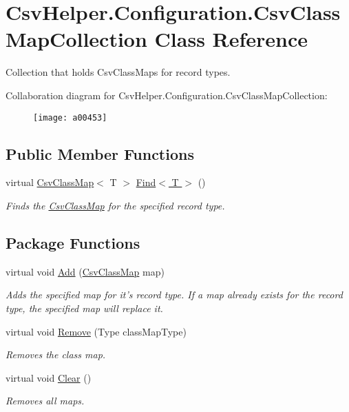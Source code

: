 \hypertarget{a00059}{\section{Csv\-Helper.\-Configuration.\-Csv\-Class\-Map\-Collection Class Reference}
\label{a00059}
}


Collection that holds Csv\-Class\-Maps for record types.  




Collaboration diagram for Csv\-Helper.\-Configuration.\-Csv\-Class\-Map\-Collection\-:
\nopagebreak
\begin{figure}[H]
\begin{center}
\leavevmode
\texttt{[image: a00453]}
\end{center}
\end{figure}
\subsection*{Public Member Functions}
\begin{DoxyCompactItemize}
\item 
virtual \hyperlink{a00057}{Csv\-Class\-Map}$<$ T $>$ \hyperlink{a00059_ac75513617b6c256c3d693adf4482e1ed}{Find$<$ T $>$} ()
\begin{DoxyCompactList}\small\item\em Finds the \hyperlink{a00057}{Csv\-Class\-Map} for the specified record type. \end{DoxyCompactList}\end{DoxyCompactItemize}
\subsection*{Package Functions}
\begin{DoxyCompactItemize}
\item 
virtual void \hyperlink{a00059_aab6a14a4c1a614fac511ddd6af2c9e40}{Add} (\hyperlink{a00057}{Csv\-Class\-Map} map)
\begin{DoxyCompactList}\small\item\em Adds the specified map for it's record type. If a map already exists for the record type, the specified map will replace it. \end{DoxyCompactList}\item 
virtual void \hyperlink{a00059_a0b18f7ab62839aa354021986e5a2ef96}{Remove} (Type class\-Map\-Type)
\begin{DoxyCompactList}\small\item\em Removes the class map. \end{DoxyCompactList}\item 
virtual void \hyperlink{a00059_a91718f9b6527a7f833393d24587716cc}{Clear} ()
\begin{DoxyCompactList}\small\item\em Removes all maps. \end{DoxyCompactList}\end{DoxyCompactItemize}
